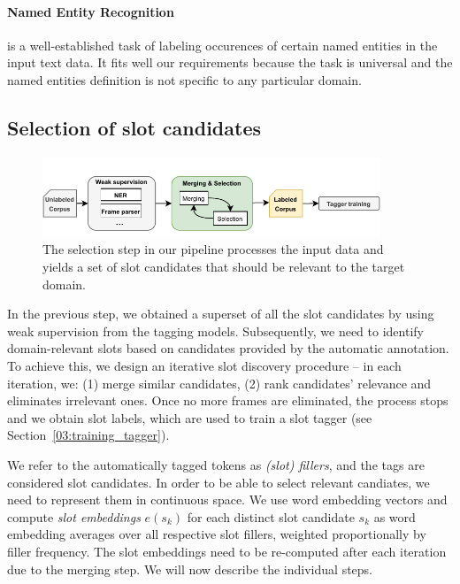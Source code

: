 \paragraph{Named Entity Recognition} is a well-established task of labeling occurences of certain named entities in the input text data.
It fits well our requirements because the task is universal and the named entities definition is not specific to any particular domain.
\subsection{Selection of slot candidates}
\label{03:candidate_selection}
\begin{figure}[h]
    \centering
    \includegraphics[width=0.9\textwidth]{images/merging.pdf}
    \caption{The selection step in our pipeline processes the input data and yields a set of slot candidates that should be relevant to the target domain.}
    \label{fig:candidate_selection}
\end{figure}
In the previous step, we obtained a superset of all the slot candidates by using weak supervision from the tagging models.
Subsequently, we need to identify domain-relevant slots based on candidates provided by the automatic annotation.
To achieve this, we design an iterative slot discovery procedure -- in each iteration, we: 
(1) merge similar candidates, 
(2) rank candidates' relevance and eliminates irrelevant ones.
Once no more frames are eliminated, the process stops and we obtain slot labels, which are used to train a slot tagger (see Section~\ref{03:training_tagger}).

We refer to the automatically tagged tokens as \emph{(slot) fillers}, and the tags are considered slot candidates.
In order to be able to select relevant candiates, we need to represent them in continuous space.
We use word embedding vectors and compute \emph{slot embeddings} $e(s_k)$ for each 
distinct slot candidate $s_k$ as word embedding averages over all respective slot fillers, weighted proportionally by filler frequency.
The slot embeddings need to be re-computed after each iteration due to the merging step.
We will now describe the individual steps.

